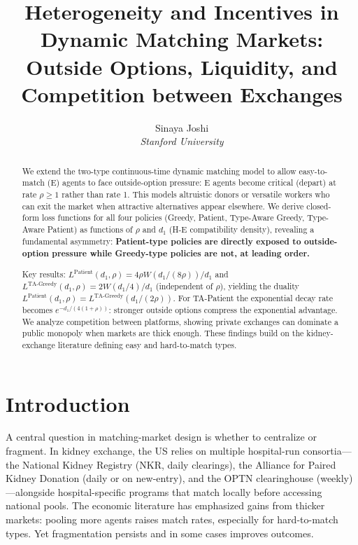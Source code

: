 \documentclass{article}
\title{Heterogeneity and Incentives in Dynamic Matching Markets:\\
Outside Options, Liquidity, and Competition between Exchanges}
\author{Sinaya Joshi \\ \textit{Stanford University}}
\theoremstyle{plain}
\theoremstyle{definition}
\begin{document}
\maketitle

\begin{abstract}
We extend the two-type continuous-time dynamic matching model to allow
easy-to-match (E) agents to face outside-option pressure: E agents become
critical (depart) at rate $\rho \ge 1$ rather than rate 1.  This models
altruistic donors or versatile workers who can exit the market when attractive
alternatives appear elsewhere.  We derive closed-form loss functions for all
four policies (Greedy, Patient, Type-Aware Greedy, Type-Aware
Patient) as functions of $\rho$ and $d_1$ (H-E compatibility density),
revealing a fundamental asymmetry: \textbf{Patient-type policies are directly
exposed to outside-option pressure while Greedy-type policies are not, at
leading order.}

Key results: $L^{\text{Patient}}(d_1,\rho)=4\rho W(d_1/(8\rho))/d_1$ and
$L^{\text{TA-Greedy}}(d_1,\rho)=2W(d_1/4)/d_1$ (independent of $\rho$),
yielding the duality $L^{\text{Patient}}(d_1,\rho)=L^{\text{TA-Greedy}}(d_1/(2\rho))$.
For TA-Patient the exponential decay rate becomes $e^{-d_1/(4(1+\rho))}$:
stronger outside options compress the exponential advantage.  We analyze
competition between platforms, showing private exchanges can dominate a
public monopoly when markets are thick enough.  These findings build on the kidney-exchange literature defining easy and hard-to-match types. 
\end{abstract}

\tableofcontents

\section{Introduction}
\label{sec:intro}

A central question in matching-market design is whether to centralize or
fragment.  In kidney exchange, the US relies on multiple hospital-run
consortia---the National Kidney Registry (NKR, daily clearings), the
Alliance for Paired Kidney Donation (daily or on new-entry), and the OPTN
clearinghouse (weekly)---alongside hospital-specific programs that match
locally before accessing national pools.  The economic literature has
emphasized gains from thicker markets: pooling more agents raises match
rates, especially for hard-to-match types.  Yet fragmentation persists and
in some cases improves outcomes.
\end{document}

